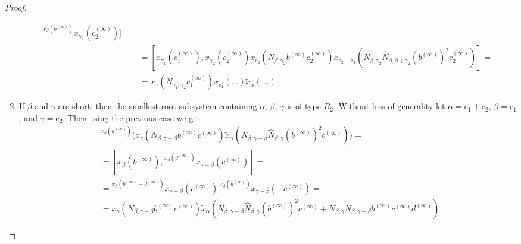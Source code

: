 \documentclass{article}
\numberwithin{equation}{section}
\theoremstyle{definition}
\theoremstyle{remark}
\newcommand{\up}[2]{{^{#1}\!{#2}}}
\begin{document}
\begin{proof}
\begin{enumerate}
\begin{align*}
  \up{x_\beta(b^{(\infty)})}
   {x_{\gamma_2}(c_2^{(\infty)})}] =\\
  &= [x_{\gamma_1}(c_1^{(\infty)}),
  x_{\gamma_2}(c_2^{(\infty)})
  x_{\mathrm e_2}(N_{\beta, \gamma_2} b^{(\infty)} c_2^{(\infty)})
  x_{\mathrm e_2 + \mathrm e_3}(N_{\beta, \gamma_2} \widehat N_{\beta, \beta + \gamma_2} (b^{(\infty)})^2 c_2^{(\infty)})] =\\
  &= x_\gamma(N_{\gamma_1, \gamma_2} c_1^{(\infty)})
  x_{\mathrm e_1}(\ldots)
  \widetilde x_\alpha(\ldots).
 \end{align*}
 \item If \(\beta\) and \(\gamma\) are short, then the smallest root subsystem containing \(\alpha\), \(\beta\), \(\gamma\) is of type \(B_2\). Without loss of generality let \(\alpha = \mathrm e_1 + \mathrm e_2\), \(\beta = \mathrm e_1\), and \(\gamma = \mathrm e_2\). Then using the previous case we get
 \begin{align*}
  &\up{x_\beta(d^{(\infty)})}
   {\bigl(x_\gamma(N_{\beta, \gamma - \beta} b^{(\infty)} c^{(\infty)})
   \widetilde x_\alpha(N_{\beta, \gamma - \beta} \widehat N_{\beta, \gamma}
   (b^{(\infty)})^2 c^{(\infty)})\bigr)} =\\
  &= [x_\beta(b^{(\infty)}),
  \up{x_\beta(d^{(\infty)})}
   {x_{\gamma - \beta}(c^{(\infty)})}] =\\
  &= \up{x_\beta(b^{(\infty)} + d^{(\infty)})}
   {x_{\gamma - \beta}(c^{(\infty)})}\,
  \up{x_\beta(d^{(\infty)})}
   {x_{\gamma - \beta}(-c^{(\infty)})} =\\
  &= x_\gamma(N_{\beta, \gamma - \beta} b^{(\infty)} c^{(\infty)})
  \widetilde x_\alpha(N_{\beta, \gamma - \beta} \widehat N_{\beta, \gamma}
   (b^{(\infty)})^2 c^{(\infty)}
   + N_{\beta, \gamma} N_{\beta, \gamma - \beta}
   b^{(\infty)} c^{(\infty)} d^{(\infty)}).
 \end{align*}
 \end{enumerate}
\end{proof}
 
\end{document}
